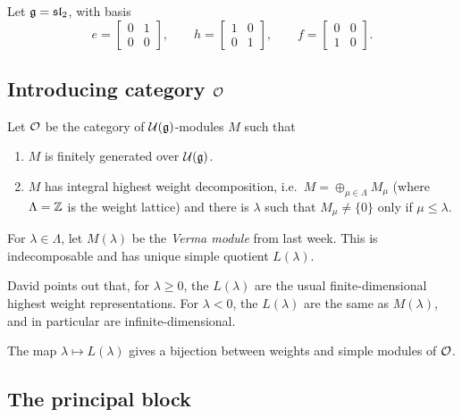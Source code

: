 \documentclass{article}
\begin{document}
Let $\mathfrak{g} = \mathfrak{sl}_2$, with basis
\[
	e = \begin{bmatrix}0 & 1\\ 0 & 0\end{bmatrix}, \hspace{2em}
	h = \begin{bmatrix}1 & 0\\ 0 & 1\end{bmatrix}, \hspace{2em}
	f = \begin{bmatrix}0 & 0\\ 1 & 0\end{bmatrix}.
\]

\subsection{Introducing category $\mathcal{O}$}

\begin{dfn}
	Let $\mathcal{O}$ be the category of $\mathcal{U}(\mathfrak{g})$-modules $M$ such that
	\begin{enumerate}
		\item $M$ is finitely generated over $\mathcal{U}(\mathfrak{g})$.
		\item $M$ has integral highest weight decomposition, i.e.\ $M = \oplus_{\mu \in \Lambda} M_\mu$ (where $\Lambda = \mathbb{Z}$ is the weight lattice) and there is $\lambda$ such that $M_\mu \neq \{ 0 \}$ only if $\mu \leq \lambda$.
	\end{enumerate}
\end{dfn}

For $\lambda \in \Lambda$, let $M(\lambda)$ be the \emph{Verma module} from last week.
This is indecomposable and has unique simple quotient $L(\lambda)$.

\begin{rmk}
	David points out that, for $\lambda \geq 0$, the $L(\lambda)$ are the usual finite-dimensional highest weight representations.
	For $\lambda < 0$, the $L(\lambda)$ are the same as $M(\lambda)$, and in particular are infinite-dimensional.
\end{rmk}

\begin{thm}
	The map $\lambda \mapsto L(\lambda)$ gives a bijection between weights and simple modules of $\mathcal{O}$.
\end{thm}

\subsection{The principal block}
\end{document}
